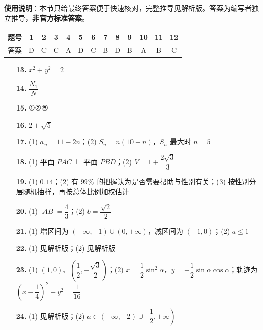 
\begin{gknotice}
\textbf{使用说明}：本节只给最终答案便于快速核对，完整推导见解析版。答案为编写者独立推导，\textbf{非官方标准答案}。
\end{gknotice}

\begin{center}\begin{tabular}{ccccccccccccc}
\toprule
题号 & 1 & 2 & 3 & 4 & 5 & 6 & 7 & 8 & 9 & 10 & 11 & 12 \\
\midrule
答案 & D & C & C & A & D & C & B & D & B & A & B & C \\
\bottomrule
\end{tabular}\end{center}

\begin{itemize}[leftmargin=2.6em]
  \item[\textbf{13.}] $x^2+y^2=2$
  \item[\textbf{14.}] $\dfrac{N_1}{N}$
  \item[\textbf{15.}] ①②⑤
  \item[\textbf{16.}] $2+\sqrt5$
\end{itemize}

\begin{itemize}[leftmargin=2.6em]
  \item[\textbf{17.}] (1) $a_n=11-2n$；(2) $S_n=n(10-n)$，$S_n$ 最大时 $n=5$
  \item[\textbf{18.}] (1) 平面 $PAC\perp$ 平面 $PBD$；(2) $V=1+\dfrac{2\sqrt3}{3}$
  \item[\textbf{19.}] (1) $0.14$；(2) 有 $99\%$ 的把握认为是否需要帮助与性别有关；(3) 按性别分层随机抽样，再按总体比例加权估计
  \item[\textbf{20.}] (1) $|AB|=\dfrac43$；(2) $b=\dfrac{\sqrt2}{2}$
  \item[\textbf{21.}] (1) 增区间为 $(-\infty,-1)\cup(0,+\infty)$，减区间为 $(-1,0)$；(2) $a\leq1$
  \item[\textbf{22.}] (1) 见解析版；(2) 见解析版
  \item[\textbf{23.}] (1) $(1,0)$、$\left(\dfrac12,-\dfrac{\sqrt3}{2}\right)$；(2) $x=\dfrac12\sin^2\alpha$，$y=-\dfrac12\sin\alpha\cos\alpha$；轨迹为 $\left(x-\dfrac14\right)^2+y^2=\dfrac1{16}$
  \item[\textbf{24.}] (1) 见解析版；(2) $a\in(-\infty,-2)\cup\left[\dfrac12,+\infty\right)$
\end{itemize}
